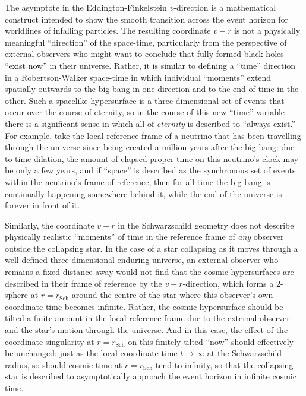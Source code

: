 \documentclass[aps,rmp,groupedaddress,twocolumn,10pt]{revtex4-2}
\begin{document}
The asymptote in the Eddington-Finkelstein $v$-direction is a mathematical construct intended to show the smooth transition across the event horizon for worldlines of infalling particles. The resulting coordinate $v-r$ is not a physically meaningful ``direction'' of the space-time, particularly from the perspective of external observers who might want to conclude that fully-formed black holes ``exist now'' in their universe. Rather, it is similar to defining a ``time'' direction in a Robertson-Walker space-time in which individual ``moments'' extend spatially outwards to the big bang in one direction and to the end of time in the other. Such a spacelike hypersurface is a three-dimensional set of events that occur over the course of eternity, so in the course of this new ``time'' variable there is a significant sense in which all of \textit{eternity} is described to ``always exist.'' For example, take the local reference frame of a neutrino that has been travelling through the universe since being created a million years after the big bang: due to time dilation, the amount of elapsed proper time on this neutrino's clock may be only a few years, and if ``space'' is described as the synchronous set of events within the neutrino's frame of reference, then for all time the big bang is continually happening somewhere behind it, while the end of the universe is forever in front of it.

Similarly, the coordinate $v-r$ in the Schwarzschild geometry does not describe physically realistic ``moments'' of time in the reference frame of \textit{any} observer outside the collapsing star. In the case of a star collapsing as it moves through a well-defined three-dimensional enduring universe, an external observer who remains a fixed distance away would not find that the cosmic hypersurfaces are described in their frame of reference by the $v-r$-direction, which forms a 2-sphere at $r=r_{\mathrm{Sch}}$ around the centre of the star where this observer's own coordinate time becomes infinite. Rather, the cosmic hypersurface should be tilted a finite amount in the local reference frame due to the external observer and the star's motion through the universe. And in this case, the effect of the coordinate singularity at $r=r_{\mathrm{Sch}}$ on this finitely tilted ``now'' should effectively be unchanged: just as the local coordinate time $t\rightarrow\infty$ at the Schwarzschild radius, so should cosmic time at $r=r_{\mathrm{Sch}}$ tend to infinity, so that the collapsing star is described to asymptotically approach the event horizon in infinite cosmic time. 
\end{document}
